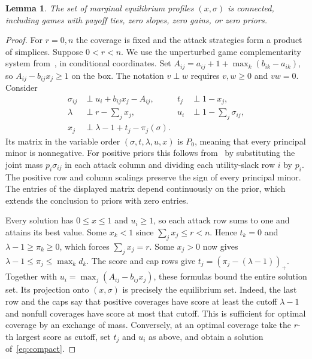 \documentclass[11pt,oneside,openany,notitlepage]{report}
\newtheorem{lemma}[theorem]{Lemma}
\begin{document}
\begin{lemma}\label{lem:connected}
The set of marginal equilibrium profiles \((x,\sigma)\) is connected,
including games with payoff ties, zero slopes, zero gains, or zero priors.
\end{lemma}
\begin{proof}
For \(r=0,n\) the coverage is fixed and the attack strategies form a product
of simplices. Suppose \(0<r<n\). We use the unperturbed game
complementarity system from~\cite[Lemmas~5.14--5.15]{book}, in conditional
coordinates. Set \(A_{ij}=a_{ij}+1+\max_k(b_{ik}-a_{ik})\), so
\(A_{ij}-b_{ij}x_j\ge1\) on the box. The notation \(v\perp w\) requires
\(v,w\ge0\) and \(vw=0\). Consider
\begin{equation}\label{eq:compact}
\begin{aligned}
 \sigma_{ij}&\perp u_i+b_{ij}x_j-A_{ij},&
 t_j&\perp 1-x_j,\\
 \lambda&\perp r-\textstyle\sum_jx_j,&
 u_i&\perp 1-\textstyle\sum_j\sigma_{ij},\\
 x_j&\perp \lambda-1+t_j-\pi_j(\sigma).&&
\end{aligned}
\end{equation}
Its matrix in the variable order \((\sigma,t,\lambda,u,x)\) is \(P_0\),
meaning that every principal minor is nonnegative. For positive priors
this follows from~\cite[Lemma~5.15]{book} by substituting the joint mass
\(p_i\sigma_{ij}\) in each attack column and dividing each utility-slack
row \(i\) by \(p_i\). The positive row and column scalings preserve the
sign of every principal minor. The entries of the displayed matrix depend
continuously on the prior, which extends the conclusion to priors with
zero entries.

Every solution has \(0\le x\le1\) and \(u_i\ge1\), so each attack row
sums to one and attains its best value. Some \(x_k<1\) since
\(\sum_j x_j\le r<n\). Hence \(t_k=0\) and \(\lambda-1\ge\pi_k\ge0\),
which forces \(\sum_j x_j=r\). Some \(x_j>0\) now gives
\(\lambda-1\le\pi_j\le\max_k d_k\). The score and cap rows give
\(t_j=(\pi_j-(\lambda-1))_+\). Together with
\(u_i=\max_j(A_{ij}-b_{ij}x_j)\), these formulas bound the entire solution
set. Its projection onto \((x,\sigma)\) is precisely the equilibrium set.
Indeed, the last row and the caps say that positive coverages have score at
least the cutoff \(\lambda-1\) and nonfull coverages have score at most that
cutoff. This is sufficient for optimal coverage by an exchange of mass.
Conversely, at an optimal coverage take the \(r\)-th largest score as
cutoff, set \(t_j\) and \(u_i\) as above, and obtain a solution
of~\eqref{eq:compact}.


\end{proof}
\end{document}
